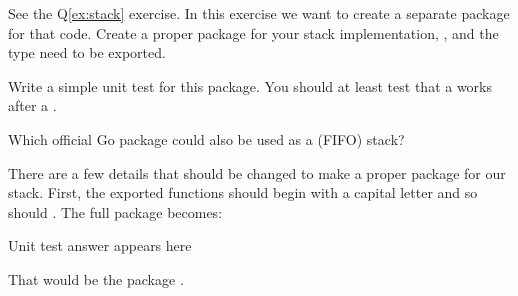 \begin{Exercise}[title={Stack as package},difficulty=2]
\label{ex:stack-package}
\Question\label{ex:stack-package q1} 
See the Q\ref{ex:stack} exercise. In this exercise we want to create
a separate package for that code.
Create a proper package for your
stack implementation, ,  and the  type need to be
exported.

\Question\label{ex:stack-package q2} Write a simple unit test for this package.
You should at least test that a  works after a .

\Question\label{ex:stack-package q3} Which official Go package could
also be used as a (FIFO) stack?
\end{Exercise}

\begin{Answer}
\Question There are a few details that should be changed to make a proper package
for our stack. First, the exported functions should begin with a capital 
letter and so should . The full package becomes:


\Question Unit test answer appears here

\Question That would be the package .
\end{Answer}
